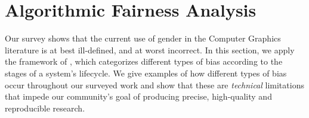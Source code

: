 \documentclass[nonacm,sigconf,review,balance=false]{acmart}
\begin{document}

\section{Algorithmic Fairness Analysis}

Our survey shows that the current use of gender in the Computer Graphics literature is at best ill-defined, and at worst incorrect. 
In this section, 
we apply the framework of \citet{Suresh2021}, which categorizes different types of bias according to the stages of a system's lifecycle. 
We give examples of how different types of bias occur throughout our surveyed work and show that these are \emph{technical} limitations that impede our community's goal of producing precise, high-quality and reproducible research.
\end{document}
